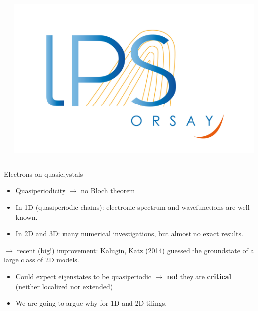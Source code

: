 \documentclass[xcolor=x11names,compress,professionalfonts, aspectratio=169]{beamer}
\renewcommand{\(}{\begin{columns}}
\renewcommand{\)}{\end{columns}}
\newcommand{\<}[1]{\begin{column}{#1}}
\renewcommand{\>}{\end{column}}
\begin{document}
\begin{frame}
\begin{columns}
\begin{column}{6cm}
\end{column}
\begin{column}{2cm}
~\\
~\\
~\\
~\\
\raggedleft
\includegraphics[scale=.15]{img/logo-lps.jpg}
\end{column}
\end{columns}
\end{frame}

\begin{frame}{Electrons on quasicrystals}
\begin{itemize}
	\item Quasiperiodicity $\to$ no Bloch theorem
	\item In 1D (quasiperiodic chains): electronic spectrum and wavefunctions are well known. 
	\item In 2D and 3D: many numerical investigations, but almost no exact results.
\end{itemize}
$\rightarrow$ recent (big!) improvement: Kalugin, Katz (2014) guessed the groundstate of a large class of 2D models.

\begin{itemize}
	\item Could expect eigenstates to be quasiperiodic $\to$ \textbf{no!} they are \textbf{critical} (neither localized nor extended)
	\item We are going to argue why for 1D and 2D tilings.
\end{itemize}
\end{frame}
\end{document}
